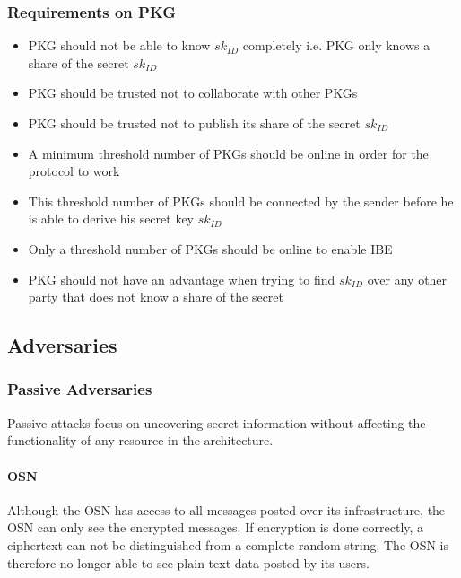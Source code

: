 \documentclass[12pt,openany]{article}
\begin{document}
\subsubsection{Requirements on PKG}
\begin{itemize}
 \item PKG should not be able to know $sk_{ID}$ completely i.e. PKG only knows
a share of the secret $sk_{ID}$
 \item PKG should be trusted not to collaborate with other PKGs
 \item PKG should be trusted not to publish its share of the secret $sk_{ID}$
 \item A minimum threshold number of PKGs should be online in order for the
protocol to work
 \item This threshold number of PKGs should be connected by the sender before
he is able to derive his secret key $sk_{ID}$
 \item Only a threshold number of PKGs should be online to enable IBE
 \item PKG should not have an advantage when trying to find $sk_{ID}$ over any
other party that does not know a share of the secret
\end{itemize}

\subsection{Adversaries}
\subsubsection{Passive Adversaries}
Passive attacks focus on uncovering secret information without affecting the
functionality of any resource in the architecture.

\paragraph{OSN} Although the OSN has access to all messages posted over its
infrastructure, the OSN can only see the encrypted messages. If encryption is
done correctly, a ciphertext can not be distinguished from a complete random
string. The OSN is therefore no longer able to see plain text data posted by its
users.
\end{document}
